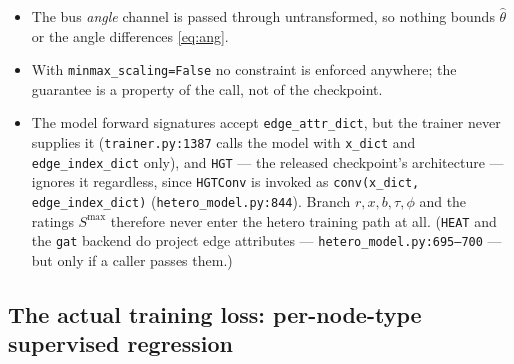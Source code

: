 \documentclass[11pt]{article}
\newcommand{\pred}[1]{\widehat{#1}}
\newcommand{\code}[1]{\texttt{\small #1}}
\begin{document}
\begin{itemize}
\item The bus \emph{angle} channel is passed through untransformed, so nothing bounds
      $\pred\theta$ or the angle differences \eqref{eq:ang}.
\item With \code{minmax\_scaling=False} no constraint is enforced anywhere; the guarantee is
      a property of the call, not of the checkpoint.
\item The model forward signatures accept \code{edge\_attr\_dict}, but the trainer never
      supplies it (\code{trainer.py:1387} calls the model with \code{x\_dict} and
      \code{edge\_index\_dict} only), and \code{HGT} --- the released checkpoint's
      architecture --- ignores it regardless, since \code{HGTConv} is invoked as
      \code{conv(x\_dict, edge\_index\_dict)} (\code{hetero\_model.py:844}). Branch
      $r,x,b,\tau,\phi$ and the ratings $S^{\max}$ therefore never enter the hetero training
      path at all. (\code{HEAT} and the \code{gat} backend do project edge attributes ---
      \code{hetero\_model.py:695--700} --- but only if a caller passes them.)
\end{itemize}

\subsection{The actual training loss: per-node-type supervised regression}
\end{document}
